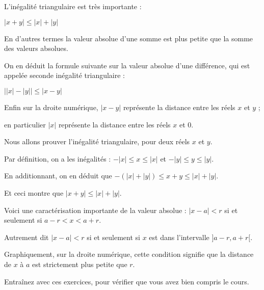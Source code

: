 L'inégalité triangulaire  est très importante : 

$|x+y|\leq |x|+|y|$

En d'autres termes la valeur absolue d'une somme est plus petite que 
la somme des valeurs absolues.

\change 

On en déduit la formule suivante sur la valeur absolue d'une différence, 
qui est appelée seconde inégalité triangulaire :

$\big||x|-|y|\big|\leq |x-y|$


\change

Enfin sur la droite numérique, $|x-y|$ représente la distance entre les
réels $x$ et $y$ ;


en particulier $|x|$ représente la distance entre les réels $x$ et $0$.


\diapo

Nous allons prouver l'inégalité triangulaire, pour deux réels $x$ et $y$.

\change

Par définition, on a les inégalités :
$-|x|\leq x \leq |x|$ \quad et \quad $-|y|\leq y \leq |y|$.

\change

En additionnant, on en déduit que 
$-\left(|x|+|y|\right)\leq x+y\leq |x|+|y|$.

\change

Et ceci montre que $|x+y|\leq |x|+|y|$.

\change

Voici une caractérisation importante de la valeur absolue :
$|x-a|<r$ si et seulement si $a-r< x <a+r$.

\change

Autrement dit $|x-a|<r$ si et seulement si $x$ est dans l'intervalle $]a-r,a+r[$.

\change

Graphiquement, sur la droite numérique, cette condition signifie 
que la distance de $x$ à $a$ est strictement plus petite que $r$.



\diapo

Entraînez avec ces exercices, 
pour vérifier que vous avez bien compris le cours.



